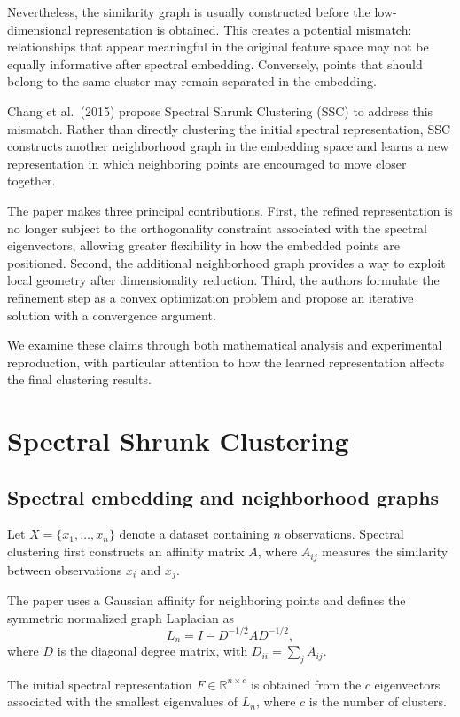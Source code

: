 \documentclass{article}
\begin{document}
Nevertheless, the similarity graph is usually constructed before the low-dimensional representation is obtained. This creates a potential mismatch: relationships that appear meaningful in the original feature space may not be equally informative after spectral embedding. Conversely, points that should belong to the same cluster may remain separated in the embedding.

Chang et al.\ (2015) propose Spectral Shrunk Clustering (SSC) to address this mismatch. Rather than directly clustering the initial spectral representation, SSC constructs another neighborhood graph in the embedding space and learns a new representation in which neighboring points are encouraged to move closer together.

The paper makes three principal contributions. First, the refined representation is no longer subject to the orthogonality constraint associated with the spectral eigenvectors, allowing greater flexibility in how the embedded points are positioned. Second, the additional neighborhood graph provides a way to exploit local geometry after dimensionality reduction. Third, the authors formulate the refinement step as a convex optimization problem and propose an iterative solution with a convergence argument.

We examine these claims through both mathematical analysis and experimental reproduction, with particular attention to how the learned representation affects the final clustering results.

\section{Spectral Shrunk Clustering}

\subsection{Spectral embedding and neighborhood graphs}

Let \(X=\{x_1,\ldots,x_n\}\) denote a dataset containing \(n\) observations. Spectral clustering first constructs an affinity matrix \(A\), where \(A_{ij}\) measures the similarity between observations \(x_i\) and \(x_j\).

The paper uses a Gaussian affinity for neighboring points and defines the symmetric normalized graph Laplacian as
\[
L_n=I-D^{-1/2}AD^{-1/2},
\]
where \(D\) is the diagonal degree matrix, with \(D_{ii}=\sum_j A_{ij}\).

The initial spectral representation \(F\in\mathbb{R}^{n\times c}\) is obtained from the \(c\) eigenvectors associated with the smallest eigenvalues of \(L_n\), where \(c\) is the number of clusters.
\end{document}
